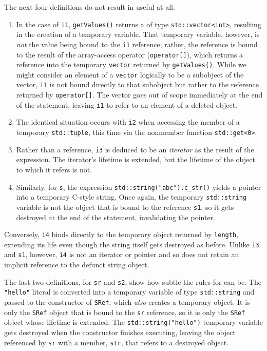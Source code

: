 {{{The next four definitions do not result in useful  at all.
\begin{enumerate}
\item{In the case of \lstinline!i1!, \lstinline!getValues()! returns a  of type \lstinline!std::vector<int>!, resulting in the creation of a temporary variable. That temporary variable, however, is \emph{not} the value being bound to the \lstinline!i1! reference; rather, the reference is bound to the result of the array-access operator (\lstinline!operator[]!), which returns a reference into the temporary \lstinline!vector! returned by \lstinline!getValues()!. While we might consider an element of a \lstinline!vector! logically to be a subobject of the vector, \lstinline!i1! is not bound directly to that subobject but rather to the reference returned by \lstinline!operator[]!. The vector goes out of scope immediately at the end of the statement, leaving \lstinline!i1! to refer to an element of a deleted object.}
\item{The identical situation occurs with \lstinline!i2! when accessing the member of a temporary \lstinline!std::tuple!, this time via the nonmember function \lstinline!std::get<0>!.}
\item{Rather than a reference, \lstinline!i3! is deduced to be an \emph{iterator} as the result of the expression. The iterator’s lifetime is extended, but the lifetime of the object to which it refers is not.}
\item{Similarly, for \lstinline!s!, the expression \lstinline!std::string("abc").c_str()! yields a pointer into a temporary C-style string. Once again, the temporary \lstinline!std::string! variable is not the object that is bound to the reference \lstinline!s1!, so it gets destroyed at the end of the statement, invalidating the pointer.}
\end{enumerate}

Conversely, \lstinline!i4! binds directly to the temporary object returned
by \lstinline!length!, extending its life even though the string itself
gets destroyed as before. Unlike \lstinline!i3! and \lstinline!s1!, however,
\lstinline!i4! is not an iterator or pointer and so does not retain an
implicit reference to the defunct string object.

The last two definitions, for \lstinline!sr! and \lstinline!s2!, show how
subtle the rules for  can be. The
\lstinline!"hello"! literal is converted into a temporary variable of type
\lstinline!std::string! and passed to the constructor of \lstinline!SRef!,
which \emph{also} creates a temporary object. It is only the
\lstinline!SRef! object that is bound to the \lstinline!sr! reference, so it
is only the \lstinline!SRef! object whose lifetime is extended. The
\lstinline!std::string("hello")! temporary variable gets destroyed when the
constructor finishes executing, leaving the object referenced by
\lstinline!sr! with a member, \lstinline!str!, that refers to a destroyed
object.

}}}
